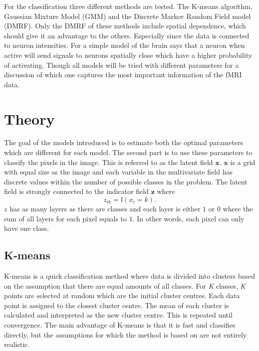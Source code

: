 \documentclass[a4paper,english]{article}
\begin{document}
For the classification three different methods are tested.
The K-means algorithm, Gaussian Mixture Model (GMM) and the Discrete Markov Random Field model (DMRF).
Only the DMRF of these methods include spatial dependence, which should give it an advantage to the others.
Especially since the data is connected to neuron intensities.
For a simple model of the brain says that a neuron when active will send signals to neurons spatially close which have a higher probability of activating.
Though all models will be tried with different parameters for a discussion of which one captures the most important information of the fMRI data.

\section{Theory}
The goal of the models introduced is to estimate both the optimal parameters which are different for each model.
The second part is to use these parameters to classify the pixels in the image.
This is referred to as the latent field $\boldsymbol{x}$.
$\boldsymbol{x}$ is a grid with equal size as the image and each variable in the multivariate field has discrete values within the number of possible classes in the problem.
The latent field is strongly connected to the indicator field $\boldsymbol{z}$ where
\begin{equation}
  z_{ik} = \mathds{I}(x_i = k).
\end{equation}
$z$ has as many layers as there are classes and each layer is either $1$ or $0$ where the sum of all layers for each pixel equals to $1$.
In other words, each pixel can only have one class.

\subsection{K-means}
K-means is a quick classification method where data is divided into clusters based on the assumption that there are equal amounts of all classes. For \textit{K} classes, \textit{K} points are selected at random which are the initial cluster centres. Each data point is assigned to the closest cluster centre. The mean of each cluster is calculated and interpreted as the new cluster centre. This is repeated until convergence. The main advantage of K-means is that it is fast and classifies directly, but the assumptions for which the method is based on are not entirely realistic.
\end{document}
